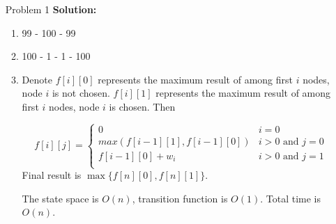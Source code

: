 \normalfont\documentclass[letterpaper,11pt]{article}
\begin{document}
\setlength{\parindent}{2ex}
\newcommand{\header}{
	\noindent {}
}
\bigskip
\header

\begin{enumerate}
\item [Problem 1]\textbf{Solution:}\par
	\begin{enumerate}
		\item 99 - 100 - 99
		\item 100 - 1 - 1 - 100 
		\item Denote $f[i][0]$ represents the maximum result of among first $i$ nodes, node $i$ is not chosen. $f[i][1]$ represents the maximum result of among first $i$ nodes, node $i$ is chosen. Then 

		$$ f[i][j]=\left\{
			\begin{array}{ll}
			0   &    i = 0\\
			max(f[i-1][1],f[i-1][0]) &           i > 0 \text{ and } j=0\\
			f[i-1][0] + w_i  &          i > 0 \text{ and } j = 1\\
			\end{array} \right. 
		$$
		Final result is $\max\{f[n][0],f[n][1]\}$.\par
		The state space is $O(n)$, transition function is $O(1)$. Total time is $O(n)$.
	\end{enumerate}
		

\end{enumerate}
\end{document}
